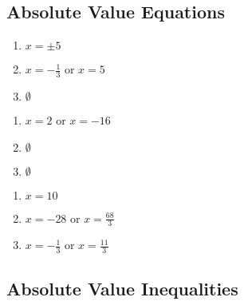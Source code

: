 \subsection*{Absolute Value Equations}

\begin{multicols}{3}
\begin{enumerate}
	\item $x = \pm 5$
	\item $x = -\frac{1}{3} \text{ or } x = 5$
	\item $\emptyset$
\end{enumerate}	\setcounter{Review}{\value{enumi}}
\end{multicols}
\begin{multicols}{3}
\begin{enumerate}	\setcounter{enumi}{\value{Review}}
	\item $x = 2$ or $x = -16$
	\item $\emptyset$
	\item $\emptyset$
\end{enumerate}	\setcounter{Review}{\value{enumi}}
\end{multicols}
\begin{multicols}{3}
\begin{enumerate}	\setcounter{enumi}{\value{Review}}
	\item $x = 10$
	\item $x = -28$ or $x = \frac{68}{3}$
	\item $x = -\frac{1}{3}$ or $x = \frac{11}{3}$
\end{enumerate}	\setcounter{Review}{\value{enumi}}
\end{multicols}



\subsection*{Absolute Value Inequalities}

